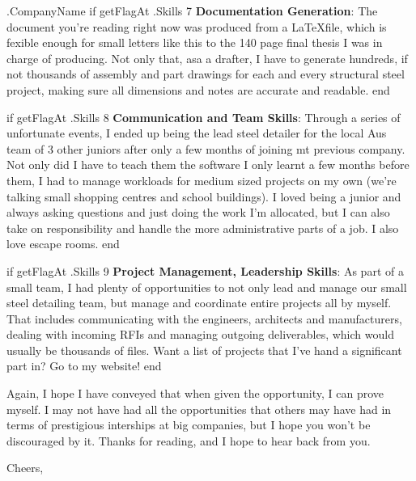 \documentclass[10pt]{letter}
\begin{document}
\begin{letter}{
    {{ .CompanyName }}
}
{{ if getFlagAt .Skills 7 }}
\textbf{Documentation Generation}: The document you're reading right now was produced from a \LaTeX file, which is fexible enough for small letters like this to the 140 page final thesis I was in charge of producing. Not only that, asa a drafter, I have to generate hundreds, if not thousands of assembly and part drawings for each and every structural steel project, making sure all dimensions and notes are accurate and readable. 
{{ end }}

{{ if getFlagAt .Skills 8 }}
\textbf{Communication and Team Skills}: Through a series of unfortunate events, I ended up being the lead steel detailer for the local Aus team of 3 other juniors after only a few months of joining mt previous company. Not only did I have to teach them the software I only learnt a few months before them, I had to manage workloads for medium sized projects on my own (we're talking small shopping centres and school buildings). I loved being a junior and always asking questions and just doing the work I'm allocated, but I can also take on responsibility and handle the more administrative parts of a job. I also love escape rooms. 
{{ end }}

{{ if getFlagAt .Skills 9 }}
\textbf{Project Management, Leadership Skills}: As part of a small team, I had plenty of opportunities to not only lead and manage our small steel detailing team, but manage and coordinate entire projects all by myself. That includes communicating with the engineers, architects and manufacturers, dealing with incoming RFIs and managing outgoing deliverables, which would usually be thousands of files. Want a list of projects that I've hand a significant part in? Go to my website!
{{ end }}

Again, I hope I have conveyed that when given the opportunity, I can prove myself. I may not have had all the opportunities that others may have had in terms of prestigious interships at big companies, but I hope you won't be discouraged by it. Thanks for reading, and I hope to hear back from you. 


\closing{Cheers,}

\end{letter}
\end{document}

